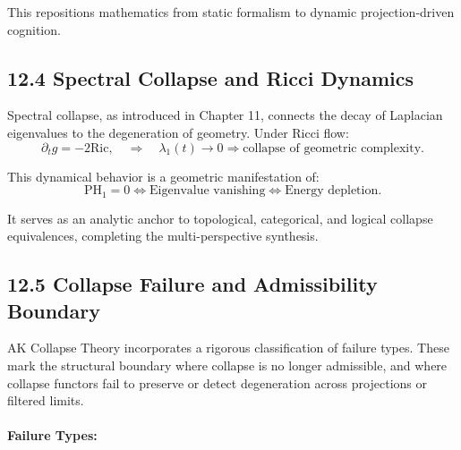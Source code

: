 \documentclass[11pt]{article}
\begin{document}
This repositions mathematics from static formalism to dynamic projection-driven cognition.

\subsection*{12.4 Spectral Collapse and Ricci Dynamics}

Spectral collapse, as introduced in Chapter 11, connects the decay of Laplacian eigenvalues to the degeneration of geometry. Under Ricci flow:
\[
\partial_t g = -2 \mathrm{Ric}, \quad \Rightarrow \quad \lambda_1(t) \to 0 \Rightarrow \text{collapse of geometric complexity}.
\]

This dynamical behavior is a geometric manifestation of:
\[
\mathrm{PH}_1 = 0 \iff \text{Eigenvalue vanishing} \iff \text{Energy depletion}.
\]

It serves as an analytic anchor to topological, categorical, and logical collapse equivalences, completing the multi-perspective synthesis.

\subsection*{12.5 Collapse Failure and Admissibility Boundary}

AK Collapse Theory incorporates a rigorous classification of failure types. These mark the structural boundary where collapse is no longer admissible, and where collapse functors fail to preserve or detect degeneration across projections or filtered limits.

\paragraph{Failure Types:}
\end{document}
